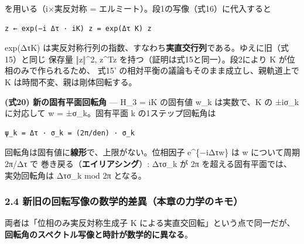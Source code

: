 \documentclass[
  a4paper,
]{ltjsarticle}
\begin{document}
を用いる（i×実反対称 = エルミート）。段1の写像（式16）に代入すると

\begin{verbatim}
z ← exp(−i Δτ · iK) z = exp(Δτ K) z
\end{verbatim}

exp(ΔτK)
は実反対称行列の指数、すなわち\textbf{実直交行列}である。ゆえに旧（式15）と同じ
保存量 ‖z‖\^{}2, z\^{}Tz を持つ（証明は式15と同一）。段2により K
が位相のみで作られるため、 式15'
の相対平衡の議論もそのまま成立し、親軌道上で K
は時間不変、親は剛体回転する。

\textbf{(式20) 新の固有平面回転角} --- H\_3 = iK の固有値 w\_k
は実数で、K の ±iσ\_k に対応して w = ±σ\_k。固有平面 k
の1ステップ回転角は

\begin{verbatim}
ψ_k = Δτ · σ_k = (2π/den) · σ_k
\end{verbatim}

回転角は固有値に\textbf{線形}で、上限がない。位相因子 e\^{}\{−iΔτw\} は
w について周期 2π/Δτ で 巻き戻る（\textbf{エイリアシング}）: Δτσ\_k が
2π を超える固有平面では、実効回転角は Δτσ\_k mod 2π となる。

\subsubsection{2.4
新旧の回転写像の数学的差異（本章の力学のキモ）}\label{ux65b0ux65e7ux306eux56deux8ee2ux5199ux50cfux306eux6570ux5b66ux7684ux5deeux7570ux672cux7ae0ux306eux529bux5b66ux306eux30adux30e2}

両者は「位相のみ実反対称生成子 K による実直交回転」という点で同一だが、
\textbf{回転角のスペクトル写像と時計が数学的に異なる}。
\end{document}
